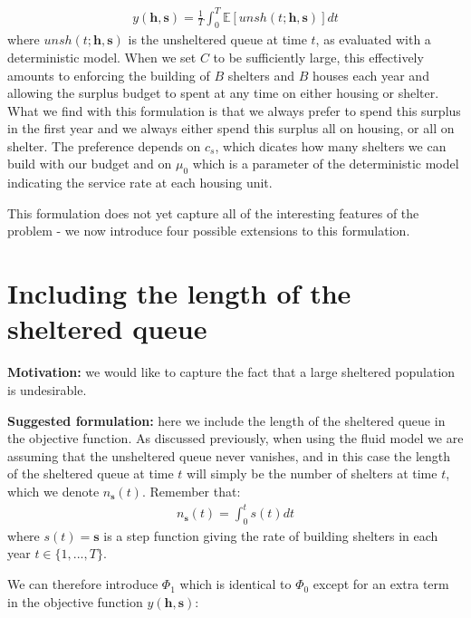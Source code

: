 \documentclass{article}
\begin{document}
\begin{align*}
  y(\boldsymbol{h},\boldsymbol{s}) = \frac{1}{T} \int_0^T \mathbb{E}[unsh(t; \boldsymbol{h},\boldsymbol{s})] dt
\end{align*}
where $unsh(t;\boldsymbol{h},\boldsymbol{s})$ is the unsheltered queue at time $t$, as evaluated with a deterministic model. When we set $C$ to be sufficiently large, this effectively amounts to enforcing the building of $B$ shelters and $B$ houses each year and allowing the surplus budget to spent at any time on either housing or shelter. What we find with this formulation is that we always prefer to spend this surplus in the first year and we always either spend this surplus all on housing, or all on shelter. The preference depends on $c_s$, which dicates how many shelters we can build with our budget and on $\mu_0$ which is a parameter of the deterministic model indicating the service rate at each housing unit. \par
%
This formulation does not yet capture all of the interesting features of the problem - we now introduce four possible extensions to this formulation. \newpage

\section{Including the length of the sheltered queue}

\textbf{Motivation:} we would like to capture the fact that a large sheltered population is undesirable.

\textbf{Suggested formulation:} here we include the length of the sheltered queue in the objective function. As discussed previously, when using the fluid model we are assuming that the unsheltered queue never vanishes, and in this case the length of the sheltered queue at time $t$ will simply be the number of shelters at time $t$, which we denote $n_{\boldsymbol{s}}(t)$. Remember that:
\begin{align*}
  n_{\boldsymbol{s}}(t) = \int_0^t s(t) dt
\end{align*}
where $s(t)=\boldsymbol{s}$ is a step function giving the rate of building shelters in each year  $t \in \{1, ..., T\}$. \par
%
We can therefore introduce $\Phi_1$ which is identical to $\Phi_0$ except for an extra term in the objective function $y(\boldsymbol{h},\boldsymbol{s})$: 
\end{document}

